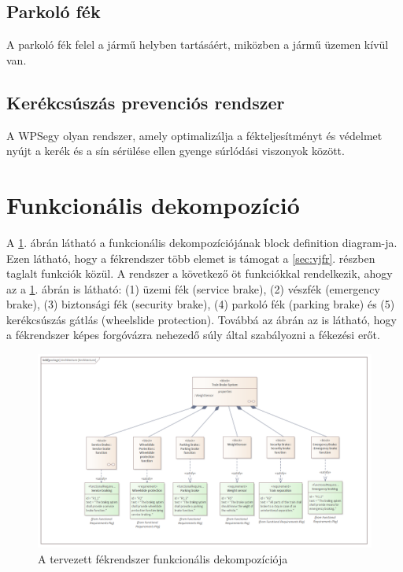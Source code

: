 \subsection{Parkoló fék}
A parkoló fék felel a jármű helyben tartásáért, miközben a jármű üzemen kívül van. 

\subsection{Kerékcsúszás prevenciós rendszer}
A WPS\footnotemark[\value{footnote}] egy olyan rendszer, amely optimalizálja a fékteljesítményt és védelmet nyújt a kerék és a sín sérülése ellen gyenge súrlódási viszonyok között.

\section{Funkcionális dekompozíció}
A \ref{fig:func_arch}. ábrán látható a funkcionális dekompozíciójának block definition diagram-ja.
Ezen látható, hogy a fékrendszer több elemet is támogat a \ref{sec:vjfr}. részben taglalt funkciók közül.
A rendszer a következő öt funkciókkal rendelkezik, ahogy az a \ref{fig:func_arch}. ábrán is látható: 
(1) üzemi fék (service brake), 
(2) vészfék (emergency brake), 
(3) biztonsági fék (security brake),
(4) parkoló fék (parking brake) és 
(5) kerékcsúszás gátlás (wheelslide protection).
Továbbá az ábrán az is látható, hogy a fékrendszer képes forgóvázra nehezedő súly által szabályozni a fékezési erőt.

\begin{figure}
    \footnotesize
    \centering
    \includegraphics[width=150mm, keepaspectratio]{figures/Architecture.png}
    \caption{A tervezett fékrendszer funkcionális dekompozíciója}
    \label{fig:func_arch}
\end{figure}

